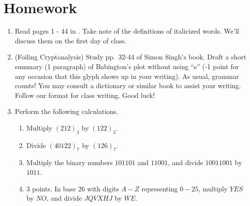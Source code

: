 \section{Homework}

\begin{enumerate}
\item Read pages 1 - 44 in \cite{Singh}.  Take note of the definitions of italicized words.  We'll discuss them on the first day of class.

\item (Foiling Cryptanalysis) Study pp.\ 32-44 of Simon Singh's book.  Draft a short summary (1 paragraph) of Babington's plot without using ``e'' (-1 point for any occasion that this glyph shows up in your writing). As usual, grammar counts! You may consult a dictionary or similar book to assist your writing.  Follow our format for class writing.  Good luck!
\item Perform the following calculations.
\begin{enumerate}
\item Multiply $(212)_3$ by $(122)_3$.
\item Divide $(40122)_7$ by $(126)_7$.
\item Multiply the binary numbers $101101$ and $11001$, and divide $10011001$ by $1011$.
\item 3 points. In base 26 with digits $A - Z$ representing $0 - 25$, multiply $YES$ by $NO$, and divide $JQVXHJ$ by $WE$.
\end{enumerate}
\end{enumerate}

